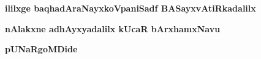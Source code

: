 


\begin{center}
{\bf ililxge baqhadAraNayxkoVpaniSadf BASayxvAtiRkadalilx}
\smallskip

{\bf nAlakxne adhAyxyadalilx kUcaR bArxhamxNavu}
\smallskip

{\bf pUNaRgoMDide}
\end{center}


